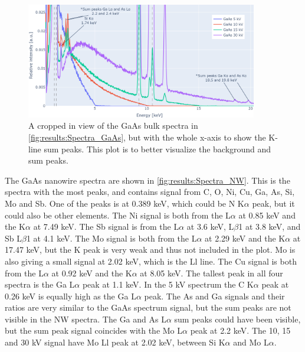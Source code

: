 \begin{figure}[h]
    \centering
    \includegraphics[width=0.90\textwidth]{figures/each_spectra/GaAs_bg_and_sum_peaks.png}
    \caption{
        A cropped in view of the GaAs bulk spectra in \cref{fig:results:Spectra_GaAs}, but with the whole x-axis to show the K-line sum peaks.
        This plot is to better visualize the background and sum peaks.
    }
    \label{fig:results:Spectra_GaAs_bg_and_sum_peaks}
\end{figure}







The GaAs nanowire spectra are shown in \cref{fig:results:Spectra_NW}.
This is the spectra with the most peaks, and contains signal from C, O, Ni, Cu, Ga, As, Si, Mo and Sb.
One of the peaks is at 0.389 keV, which could be N K$\alpha$ peak, but it could also be other elements. %
The Ni signal is both from the L$\alpha$ at 0.85 keV and the K$\alpha$ at 7.49 keV.
The Sb signal is from the L$\alpha$ at 3.6 keV, L$\beta$1 at 3.8 keV, and Sb L$\beta$1 at 4.1 keV. %
The Mo signal is both from the L$\alpha$ at 2.29 keV and the K$\alpha$ at 17.47 keV, but the K peak is very weak and thus not included in the plot.
Mo is also giving a small signal at 2.02 keV, which is the Ll line.
The Cu signal is both from the L$\alpha$ at 0.92 keV and the K$\alpha$ at 8.05 keV.
The tallest peak in all four spectra is the Ga L$\alpha$ peak at 1.1 keV.
In the 5 kV spectrum the C K$\alpha$ peak at 0.26 keV is equally high as the Ga L$\alpha$ peak.
The As and Ga signals and their ratios are very similar to the GaAs spectrum signal, but the sum peaks are not visible in the NW spectra.
The Ga and As L$\alpha$ sum peaks could have been visible, but the sum peak signal coincides with the Mo L$\alpha$ peak at 2.2 keV. %
The 10, 15 and 30 kV signal have Mo Ll peak at 2.02 keV, between Si K$\alpha$ and Mo L$\alpha$. %



